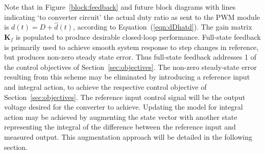 Note that in Figure~\ref{block:feedback} and future block diagrams with lines indicating `to converter circuit' the actual duty ratio as sent to the PWM module is $d(t) = D + \hat{d}(t)$, according to Equation~(\ref{eqn:dDhatd}).
\newpar
%
%
The gain matrix $\boldsymbol{K}_f$ is populated to produce desirable closed-loop performance. Full-state feedback is primarily used to achieve smooth system response to step changes in reference, but produces non-zero steady state error. Thus full-state feedback addresses 1 of the control objectives of Section~\ref{sec:objectives}. The non-zero steady-state error resulting from this scheme may be eliminated by introducing a reference input and integral action, to achieve the respective control objective of Section~\ref{sec:objectives}. The reference input control signal will be the output voltage desired for the converter to achieve.
\newpar
Updating the model for integral action may be achieved by augmenting the state vector with another state representing the integral of the difference between the reference input and measured output. This augmentation approach will be detailed in the following section.
